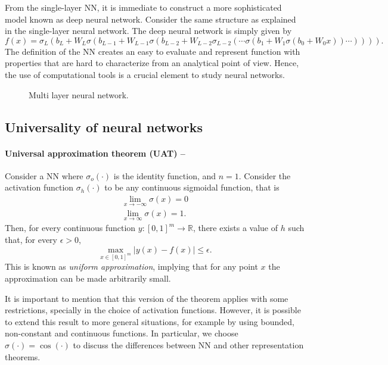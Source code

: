 \documentclass[]{report}
\begin{document}
From the single-layer NN, it is immediate to construct a more sophisticated model known as deep neural network. Consider the same structure as explained in the single-layer neural network. The deep neural network is simply given by
\begin{equation}
f(x) = \sigma_L(b_L + W_L \sigma(b_{L-1} + W_{L - 1} \sigma(b_{L-2} + W_{L - 2} \sigma_{L - 2}(\cdots\sigma(b_1 + W_1 \sigma(b_0 + W_0 x)) \cdots)))).
\end{equation}
The definition of the NN creates an easy to evaluate and represent function with properties that are hard to characterize from an analytical point of view. Hence, the use of computational tools is a crucial element to study neural networks. 

\begin{figure}

\caption{Multi layer neural network.}
\label{fig.multi-layer-neural-network}
\end{figure}

\subsection{Universality of neural networks}

\paragraph{Universal approximation theorem (UAT) \cite{cybenko1989approximation} --}Consider a NN where $\sigma_o(\cdot)$ is the identity function, and $n = 1$. Consider the activation function $\sigma_h(\cdot)$ to be any continuous sigmoidal function, that is 
\begin{align}
\lim_{x \rightarrow -\infty} \sigma(x) = 0 \\
\lim_{x \rightarrow \infty} \sigma(x) = 1.
\end{align}
Then, for every continuous function $
y:[0, 1]^m \rightarrow \mathbb R$, there exists a value of $h$ such that, for every $\epsilon > 0$, 
\begin{equation}
\max_{x \in [0, 1]^m} \left\vert y(x) - f(x)\right\vert \leq \epsilon.
\end{equation}
This is known as \textit{uniform approximation}, implying that for any point $x$ the approximation can be made arbitrarily small. 

It is important to mention that this version of the theorem applies with some restrictions, specially in the choice of activation functions. However, it is possible to extend this result to more general situations, for example by using bounded, non-constant and continuous functions. In particular, we choose $\sigma(\cdot) = \cos(\cdot)$ to discuss the differences between NN and other representation theorems. 
\end{document}
